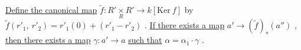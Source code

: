 \begin{center}
\end{center}
\underline{Define the canonical map}  $\tilde{f} : R' \underset{R}{\times} R' \longrightarrow k[\mathrm{Ker}\ f]$  by  $\tilde{f}(r'_1,\ r'_2) = r'_1(0)+(r'_1-r'_2)$ . \underline{If there exists a map}  $a' \longrightarrow (\tilde{f})_*(a'')$  , \underline{then there exists a map}  $\gamma: a' \longrightarrow a$ \underline{such that}  $\alpha = \alpha_1 \cdot \gamma$  .

